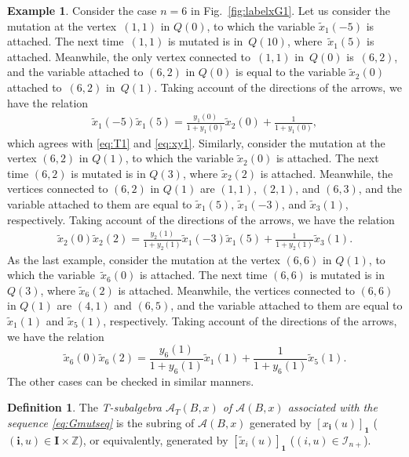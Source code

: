 \documentclass[pdftex]{sigma}
\numberwithin{equation}{section}
\theoremstyle{definition}
\newtheorem{Definition}[Theorem]{Definition}
\newtheorem{Example}[Theorem]{Example}
\begin{document}
\begin{Example}
Consider the case $n=6$ in Fig.~\ref{fig:labelxG1}.
Let us consider the mutation at the vertex~$(1,1)$ in $Q(0)$,
to which  the variable $\tilde{x}_1(-5)$ is attached.
The next time~$(1,1)$ is mutated is in~$Q(10)$,
where~$\tilde{x}_1(5)$ is attached.
Meanwhile, the only vertex connected to~$(1,1)$ in~$Q(0)$ is~$(6,2)$,
and the  variable attached to $(6,2)$ in $Q(0)$ is equal to
the variable  $\tilde{x}_2(0)$ attached to~$(6,2)$ in~$Q(1)$.
Taking account of the directions of the arrows,
we have the  relation
\begin{align*}
\tilde{x}_1(-5)\tilde{x}_1(5)=
\frac{y_1(0)}{1+y_1(0)} \tilde{x}_2(0)
+ \frac{1}{1+y_1(0)} ,
\end{align*}
which agrees with
\eqref{eq:T1} and
\eqref{eq:xy1}.
Similarly, consider the mutation at the vertex $(6,2)$ in $Q(1)$,
to which  the variable $\tilde{x}_2(0)$ is attached.
The next time $(6,2)$ is mutated is in $Q(3)$,
where $\tilde{x}_2(2)$ is attached.
Meanwhile, the vertices connected to $(6,2)$ in $Q(1)$
are $(1,1)$, $(2,1)$, and $(6,3)$,
and the  variable attached to them are equal to
$\tilde{x}_1(5)$, $\tilde{x}_1(-3)$, and $\tilde{x}_3(1)$, respectively.
Taking account of the directions of the arrows,
we have the relation
\begin{align*}
\tilde{x}_2(0)\tilde{x}_2(2)=
\frac{y_2(1)}{1+y_2(1)} \tilde{x}_1(-3)\tilde{x}_1(5)
+ \frac{1}{1+y_2(1)} \tilde{x}_3(1).
\end{align*}
As the last example,
consider the mutation at the vertex $(6,6)$ in $Q(1)$,
to which  the va\-riab\-le~$\tilde{x}_6(0)$ is attached.
The next time $(6,6)$ is mutated is in $Q(3)$,
where $\tilde{x}_6(2)$ is attached.
Meanwhile, the vertices connected to $(6,6)$ in $Q(1)$
are $(4,1)$ and $(6,5)$,
and the  variable attached to them are equal to
$\tilde{x}_1(1)$ and  $\tilde{x}_5(1)$, respectively.
Taking account of the directions of the arrows,
we have the relation
\[
\tilde{x}_6(0)\tilde{x}_6(2)=
\frac{y_6(1)}{1+y_6(1)} \tilde{x}_1(1)
+ \frac{1}{1+y_6(1)} \tilde{x}_5(1).
\]
The other cases can be checked in similar manners.
\end{Example}

\begin{Definition}
\label{def:T-sub}
The {\em T-subalgebra
$\mathcal{A}_T(B,x)$
of ${\mathcal{A}}(B,x)$
associated with the sequence \eqref{eq:Gmutseq}}
is the subring of
${\mathcal{A}}(B,x)$
generated by
$[x_{\mathbf{i}}(u)]_{\mathbf{1}}$
($(\mathbf{i},u)\in \mathbf{I}\times \mathbb{Z}$),
or equivalently,
generated by
$[\tilde{x}_{i}(u)]_{\mathbf{1}}$
($(i,u)\in \mathcal{I}_{n+}$).
\end{Definition}
\end{document}
